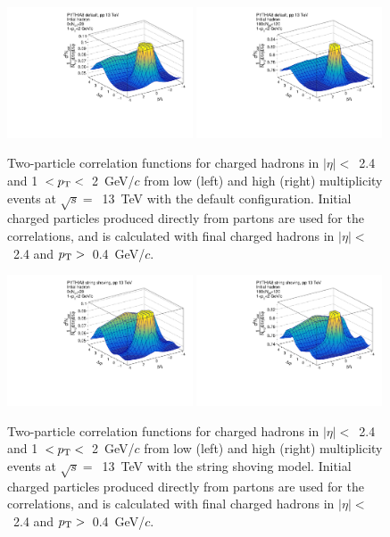 \begin{figure}[tbh]
\includegraphics[width=0.49\textwidth]{figures/2D_default_lo_initial.pdf}
\includegraphics[width=0.49\textwidth]{figures/2D_default_hi_initial.pdf}
\caption{Two-particle correlation functions for charged hadrons in $|\eta|<$~2.4 and 1~$<\mbox{$p_{\mathrm{T}}$}<$~2~GeV/$c$ from low (left) and high (right) multiplicity \pythia \pp events at $\sqrt{s}=$~13~TeV with the default configuration. Initial charged particles produced directly from partons are used for the correlations, and \Nch is calculated with final charged hadrons in $|\eta|<$~2.4 and $\mbox{$p_{\mathrm{T}}$}>$~0.4~GeV/$c$.}
\label{fig:2d_default_initial}
\end{figure}

\begin{figure}[tbh]
\includegraphics[width=0.49\textwidth]{figures/2D_shoving_lo_initial.pdf}
\includegraphics[width=0.49\textwidth]{figures/2D_shoving_hi_initial.pdf}
\caption{Two-particle correlation functions for charged hadrons in $|\eta|<$~2.4 and 1~$<\mbox{$p_{\mathrm{T}}$}<$~2~GeV/$c$ from low (left) and high (right) multiplicity \pythia \pp events at $\sqrt{s}=$~13~TeV with the string shoving model. Initial charged particles produced directly from partons are used for the correlations, and \Nch is calculated with final charged hadrons in $|\eta|<$~2.4 and $\mbox{$p_{\mathrm{T}}$}>$~0.4~GeV/$c$.}
\label{fig:2d_shoving_initial}
\end{figure}


